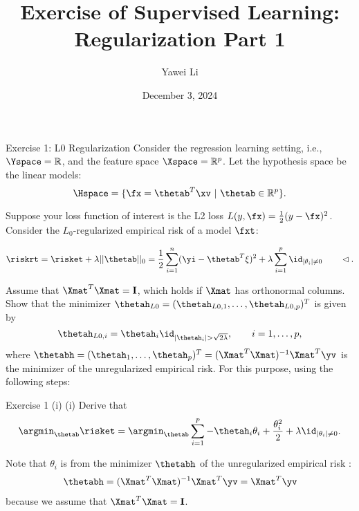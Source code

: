 \documentclass[aspectratio=169]{beamer}
\title[]{\textbf{Exercise of Supervised Learning: \\ Regularization Part 1}}
\author{Yawei Li}
\institute[LMU]
{
\\
  \texttt{yawei.li@stat.uni-muenchen.de}
}
\date{December 3, 2024}
\newcommand{\thetahi}{\thetah_i}
\newcommand{\thetai}{\theta_i}
\newcommand{\thetainnz}{\id_{|\theta_i| \neq 0}}
\newcommand{\Imat}{\mathbf{I}}
\newcommand{\sumip}{\sum_{i=1}^p}
\begin{document}
\begin{frame}
\titlepage

\end{frame}



\begin{frame}{Exercise 1: L0 Regularization}
	\small
	Consider the regression learning setting, i.e., $\Yspace = \mathbb{R}$, and the feature space $\Xspace = \mathbb{R}^p$. Let the hypothesis space be the linear models: $$\Hspace = \{ \fx = \thetab^T \xv \ | \ \thetab \in \mathbb{R}^p \}.$$
	
	Suppose your loss function of interest is the L2 loss $L(y, \fx) = \frac{1}{2} (y - \fx)^2$. Consider the $L_0$-regularized empirical risk of a model $\fxt$: 
	
	$$
		\riskrt = \risket + \lambda ||\thetab ||_0 = \frac{1}{2} \sum_{i=1}^n (\yi - \thetab^T \xi )^2 + \lambda \sum_{i=1}^p \thetainnz \qquad \lhd.
	$$
	
	Assume that $\Xmat^T \Xmat = \Imat$, which holds if $\Xmat$ has orthonormal columns. Show that the minimizer $\thetah_{L0} = (\thetah_{L0, 1}, \ldots, \thetah_{L0, p})^T$ is given by 
	$$
		\thetah_{L0, i} = \thetahi \id_{|\thetahi| > \sqrt{2 \lambda}}, \qquad i = 1, \ldots, p,
	$$
	where $\thetabh = (\thetah_1, \ldots, \thetah_p)^T = (\Xmat^T \Xmat)^{-1} \Xmat^T \yv$ is the minimizer of the unregularized empirical risk. For this purpose, using the following steps:
	
\end{frame}

\begin{frame}{Exercise 1 (i)}
	(i) Derive that 
	\begin{align*}
		\argmin_{\thetab} \risket = \argmin_{\thetab} \sumip - \thetahi \thetai + \frac{\thetai^2}{2} + \lambda \thetainnz.
	\end{align*}
	
	Note that $\thetai$ is from the minimizer $\thetabh$ of the unregularized empirical risk :
	\begin{align*}
		\thetabh = (\Xmat^T \Xmat)^{-1} \Xmat^T \yv = \Xmat^T \yv
	\end{align*}
	because we assume that $\Xmat^T \Xmat = \Imat$.
\end{frame}
\end{document}
